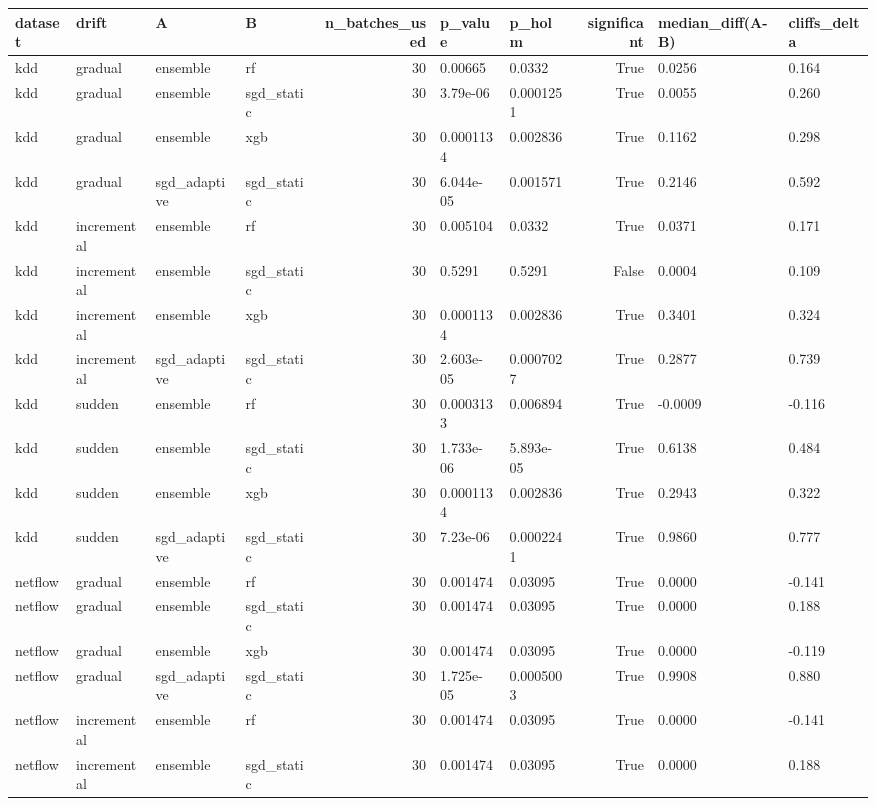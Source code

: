 \begin{tabular}{llllrllrll}
\toprule
dataset & drift & A & B & n\_batches\_used & p\_value & p\_holm & significant & median\_diff(A-B) & cliffs\_delta \\
\midrule
kdd & gradual & ensemble & rf & 30 & 0.00665 & 0.0332 & True & 0.0256 & 0.164 \\
kdd & gradual & ensemble & sgd\_static & 30 & 3.79e-06 & 0.0001251 & True & 0.0055 & 0.260 \\
kdd & gradual & ensemble & xgb & 30 & 0.0001134 & 0.002836 & True & 0.1162 & 0.298 \\
kdd & gradual & sgd\_adaptive & sgd\_static & 30 & 6.044e-05 & 0.001571 & True & 0.2146 & 0.592 \\
kdd & incremental & ensemble & rf & 30 & 0.005104 & 0.0332 & True & 0.0371 & 0.171 \\
kdd & incremental & ensemble & sgd\_static & 30 & 0.5291 & 0.5291 & False & 0.0004 & 0.109 \\
kdd & incremental & ensemble & xgb & 30 & 0.0001134 & 0.002836 & True & 0.3401 & 0.324 \\
kdd & incremental & sgd\_adaptive & sgd\_static & 30 & 2.603e-05 & 0.0007027 & True & 0.2877 & 0.739 \\
kdd & sudden & ensemble & rf & 30 & 0.0003133 & 0.006894 & True & -0.0009 & -0.116 \\
kdd & sudden & ensemble & sgd\_static & 30 & 1.733e-06 & 5.893e-05 & True & 0.6138 & 0.484 \\
kdd & sudden & ensemble & xgb & 30 & 0.0001134 & 0.002836 & True & 0.2943 & 0.322 \\
kdd & sudden & sgd\_adaptive & sgd\_static & 30 & 7.23e-06 & 0.0002241 & True & 0.9860 & 0.777 \\
netflow & gradual & ensemble & rf & 30 & 0.001474 & 0.03095 & True & 0.0000 & -0.141 \\
netflow & gradual & ensemble & sgd\_static & 30 & 0.001474 & 0.03095 & True & 0.0000 & 0.188 \\
netflow & gradual & ensemble & xgb & 30 & 0.001474 & 0.03095 & True & 0.0000 & -0.119 \\
netflow & gradual & sgd\_adaptive & sgd\_static & 30 & 1.725e-05 & 0.0005003 & True & 0.9908 & 0.880 \\
netflow & incremental & ensemble & rf & 30 & 0.001474 & 0.03095 & True & 0.0000 & -0.141 \\
netflow & incremental & ensemble & sgd\_static & 30 & 0.001474 & 0.03095 & True & 0.0000 & 0.188 \\

\end{tabular}
